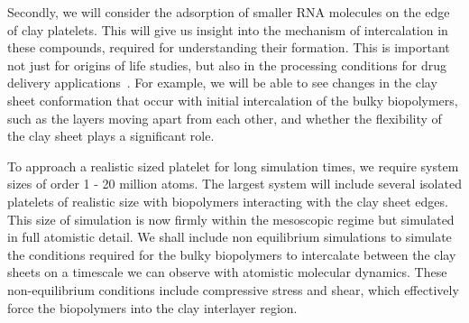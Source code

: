 %
Secondly, we will consider the adsorption of smaller RNA molecules on the edge of clay platelets. 
This will give us insight into the mechanism of
intercalation in these compounds, required for understanding their formation. This is important not just for origins of life studies, but also in the processing conditions for drug delivery applications~\cite{understanding}. For example, we will be able to see changes in the clay sheet conformation that occur with initial intercalation of the bulky biopolymers, such as the layers moving apart from each other, and whether the flexibility of the clay sheet plays a significant role. 

To approach a realistic sized platelet for long simulation times, we require system sizes 
of order 1 - 20 million atoms. The largest system will include several isolated platelets of 
realistic size with biopolymers interacting with the clay sheet edges. This size of simulation 
is now firmly within the mesoscopic regime but simulated in full atomistic detail. We shall 
include non equilibrium simulations to simulate the conditions required for the bulky biopolymers 
to intercalate between the clay sheets on a timescale we can observe with atomistic molecular 
dynamics. These non-equilibrium conditions include compressive stress and shear, which effectively 
force the biopolymers into the clay interlayer region.

